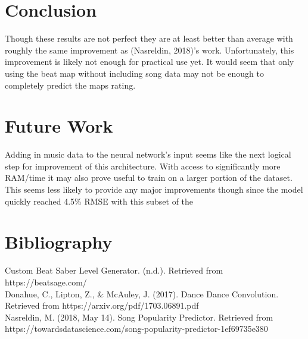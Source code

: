 \documentclass[12pt]{scrartcl}
\begin{document}
	\section{Conclusion}
	Though these results are not perfect they are at least better than average with roughly the same improvement as (Nasreldin, 2018)’s work. Unfortunately, this improvement is likely not enough for practical use yet. It would seem that only using the beat map without including song data may not be enough to completely predict the maps rating.

	\section{Future Work}
	Adding in music data to the neural network’s input seems like the next logical step for improvement of this architecture. With access to significantly more RAM/time it may also prove useful to train on a larger portion of the dataset. This seems less likely to provide any major improvements though since the model quickly reached 4.5\% RMSE with this subset of the 
	
	\section{Bibliography}
	Custom Beat Saber Level Generator. (n.d.). Retrieved from https://beatsage.com/ \\
	
	Donahue, C., Lipton, Z., \& McAuley, J. (2017). Dance Dance Convolution. Retrieved from https://arxiv.org/pdf/1703.06891.pdf \\
	
	Nasreldin, M. (2018, May 14). Song Popularity Predictor. Retrieved from https://towardsdatascience.com/song-popularity-predictor-1ef69735e380
\end{document}
